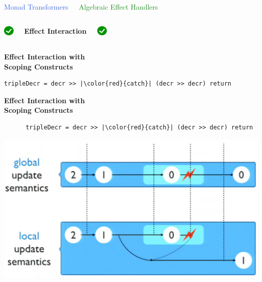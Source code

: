 \documentclass[xcolor=pdftex,dvipsnames,table]{beamer}
\def\checkmark{\includegraphics[height=0.5cm]{checkmark}}
\begin{document}
\begin{frame}
  \begin{columns}[c]
    \begin{center}
      \Large{\textcolor{RoyalBlue}{Monad Transformers}}
    \end{center}
    \begin{center}
      \Large{\textcolor{ForestGreen}{Algebraic Effect Handlers}}
    \end{center}
  \end{columns}
  \bigskip
  \bigskip
  \begin{columns}[c]
    \begin{center}
      \checkmark
    \end{center}
    \begin{center}
      \textbf{Effect Interaction}
    \end{center}
    \begin{center}
      \checkmark
    \end{center}
  \end{columns}
\end{frame}

\begin{frame}[fragile]
  \begin{center}
    \textbf{\Large{Effect Interaction with \\ Scoping Constructs}}
  \end{center}
  \bigskip
  \begin{verbatim}
tripleDecr = decr >> |\color{red}{catch}| (decr >> decr) return
  \end{verbatim}
\end{frame}

\begin{frame}[fragile]
  \begin{center}
    \textbf{\Large{Effect Interaction with \\ Scoping Constructs}}
    \bigskip
    \begin{verbatim}
      tripleDecr = decr >> |\color{red}{catch}| (decr >> decr) return
    \end{verbatim}
    {\includegraphics[scale=0.30]{interactions.png}}
  \end{center}
\end{frame}
\end{document}
